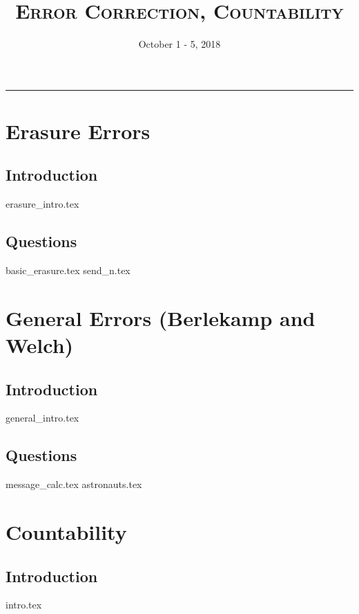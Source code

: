 \documentclass{exam}
\title{\textsc{Error Correction, Countability}}
\date{October 1 - 5, 2018}
\begin{document}
\maketitle
\rule{\textwidth}{0.15em}
\fontsize{12}{15}\selectfont


\section{Erasure Errors}
\subsection{Introduction}
{erasure_intro.tex}
\subsection{Questions}
\begin{questions}
{basic_erasure.tex}
{send_n.tex}
\end{questions}

\section{General Errors (Berlekamp and Welch)}
\subsection{Introduction}
{general_intro.tex}
\subsection{Questions}
\begin{questions}
{message_calc.tex}
{astronauts.tex}
\end{questions}

\section{Countability}
\subsection{Introduction}
{intro.tex}
\end{document}
